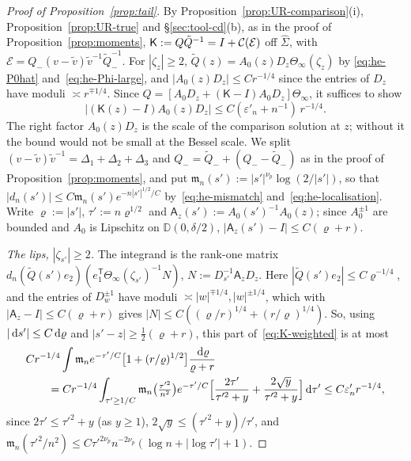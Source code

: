\begin{proof}[Proof of Proposition~\ref{prop:tail}]
By Proposition~\ref{prop:UR-comparison}(i), Proposition~\ref{prop:UR-true} and \S\ref{sec:tool-cd}(b), as in the proof of
Proposition~\ref{prop:moments}, $\mathsf K:=Q\tilde Q^{-1}=I+\mathcal{C}(\mathcal E)$ off $\hat\Sigma$, with
$\mathcal E=Q_-(v-\tilde v)\tilde v^{-1}\tilde Q_-^{-1}$. For $|\zeta_z|\ge2$, $\tilde Q(z)=A_0(z)D_z\Theta_\infty(\zeta_z)$ by
\eqref{eq:he-P0hat} and~\eqref{eq:he-Phi-large}, and $|A_0(z)D_z|\le Cr^{-1/4}$ since the entries of $D_z$ have moduli
$\asymp r^{\mp1/4}$. Since $Q=[A_0D_z+(\mathsf K-I)A_0D_z]\Theta_\infty$, it suffices to show
\begin{equation}\label{eq:K-weighted}
  |(\mathsf K(z)-I)A_0(z)D_z|\le C(\varepsilon'_n+n^{-1})\,r^{-1/4}.
\end{equation}
The right factor $A_0(z)D_z$ is the scale of the comparison solution at $z$; without it the bound would not be small at
the Bessel scale. We split $(v-\tilde v)\tilde v^{-1}=\Delta_1+\Delta_2+\Delta_3$ and $Q_-=\tilde Q_-+(Q_--\tilde Q_-)$ as in
the proof of Proposition~\ref{prop:moments}, and put $\mathfrak m_n(s'):=|s'|^{\nu_p}\log(2/|s'|)$, so that
$|d_n(s')|\le C\mathfrak m_n(s')e^{-n|s'|^{1/2}/C}$ by~\eqref{eq:he-mismatch} and~\eqref{eq:he-localisation}. Write
$\varrho:=|s'|$, $\tau':=n\varrho^{1/2}$ and $\mathsf A_z(s'):=A_0(s')^{-1}A_0(z)$; since $A_0^{\pm1}$ are bounded and $A_0$ is Lipschitz on
$\mathbb D(0,\delta/2)$, $|\mathsf A_z(s')-I|\le C(\varrho+r)$.

\emph{The lips, $|\zeta_{s'}|\ge2$.} The integrand is the rank-one matrix
$d_n(\tilde Q(s')e_2)(e_1^{\mathsf T}\Theta_\infty(\zeta_{s'})^{-1}N)$, $N:=D_{s'}^{-1}\mathsf A_zD_z$. Here $|\tilde Q(s')e_2|\le
C\varrho^{-1/4}$, and the entries of $D_w^{\pm1}$ have moduli $\asymp|w|^{\mp1/4},|w|^{\pm1/4}$, which with $|\mathsf A_z-I|\le C(\varrho+r)$
gives $|N|\le C((\varrho/r)^{1/4}+(r/\varrho)^{1/4})$. So, using $|\,\mathrm{d} s'|\le C\,\mathrm{d}\varrho$ and $|s'-z|\ge\frac12(\varrho+r)$, this
part of~\eqref{eq:K-weighted} is at most
\begin{align*}
  &Cr^{-1/4}\int\mathfrak m_ne^{-\tau'/C}\bigl[1+(r/\varrho)^{1/2}\bigr]\frac{\,\mathrm{d}\varrho}{\varrho+r}\\
  &\qquad=Cr^{-1/4}\int_{\tau'\ge1/C}\mathfrak m_n\bigl(\tfrac{\tau'^2}{n^2}\bigr)e^{-\tau'/C}\Bigl[\frac{2\tau'}{\tau'^2+y}+\frac{2\sqrt y}{\tau'^2+y}\Bigr]\,\mathrm{d} \tau'
  \le C\varepsilon'_nr^{-1/4},
\end{align*}
since $2\tau'\le \tau'^2+y$ (as $y\ge1$), $2\sqrt y\le(\tau'^2+y)/\tau'$, and $\mathfrak m_n(\tau'^2/n^2)\le C\tau'^{2\nu_p}n^{-2\nu_p}(\log n+|\log \tau'|+1)$.


\end{proof}
